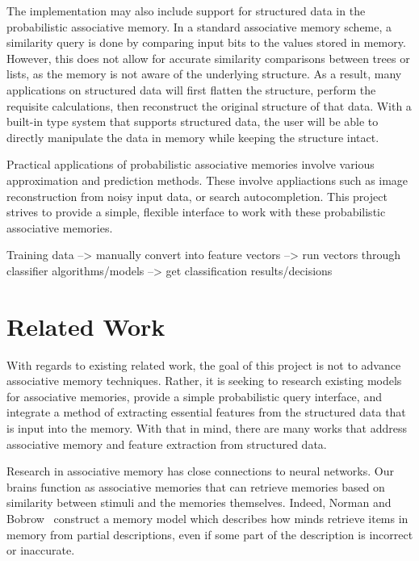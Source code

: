 \documentclass{sig-alternate}
\begin{document}

The implementation may also include support for structured data in the probabilistic associative memory.
In a standard associative memory scheme, a similarity query is done by comparing input bits
to the values stored in memory. However, this does not allow for accurate similarity comparisons
between trees or lists, as the memory is not aware of the underlying structure. As a result,
many applications on structured data will first flatten the structure, perform the requisite 
calculations, then reconstruct the original structure of that data. With a built-in type system
that supports structured data, the user will be able to directly manipulate the data in memory 
while keeping the structure intact.

Practical applications of probabilistic associative memories involve various approximation and prediction methods.
These involve appliactions such as image reconstruction from noisy input data, or search autocompletion.
This project strives to provide a simple, flexible interface to work with these probabilistic associative memories.

Training data --> manually convert into feature vectors --> run vectors through classifier algorithms/models --> get classification results/decisions

\section{Related Work}
\label{sec:related_work}

With regards to existing related work, the goal of this project is not to advance associative memory 
techniques. Rather, it is seeking to research existing models for associative memories, provide a 
simple probabilistic query interface, and integrate a method of extracting essential features from 
the structured data that is input into the memory. With that in mind, there are many works that 
address associative memory and feature extraction from structured data.

Research in associative memory has close connections to neural networks. Our brains function as 
associative memories that can retrieve memories based on similarity between stimuli and the memories 
themselves.  Indeed, Norman and Bobrow~\cite{bobrow} construct a memory model which describes how 
minds retrieve items in memory from partial descriptions, even if some part of the description is 
incorrect or inaccurate. 
\end{document}

